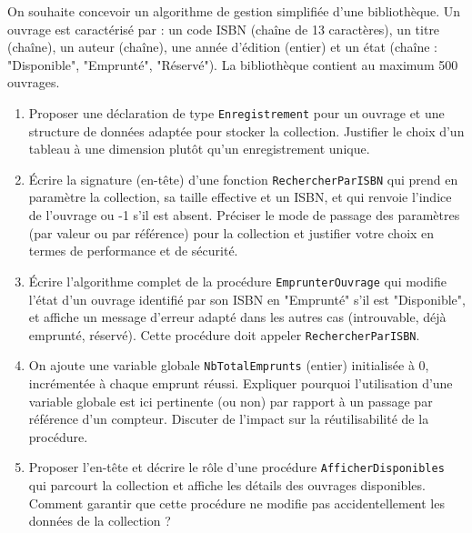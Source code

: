 \documentclass[11pt]{article}
\begin{document}
\begin{exercice}
On souhaite concevoir un algorithme de gestion simplifiée d'une bibliothèque. Un ouvrage est caractérisé par : un code ISBN (chaîne de 13 caractères), un titre (chaîne), un auteur (chaîne), une année d'édition (entier) et un état (chaîne : "Disponible", "Emprunté", "Réservé"). La bibliothèque contient au maximum 500 ouvrages.

\begin{enumerate}
    \item Proposer une déclaration de type \texttt{Enregistrement} pour un ouvrage et une structure de données adaptée pour stocker la collection. Justifier le choix d'un tableau à une dimension plutôt qu'un enregistrement unique.
    \item Écrire la signature (en-tête) d'une fonction \texttt{RechercherParISBN} qui prend en paramètre la collection, sa taille effective et un ISBN, et qui renvoie l'indice de l'ouvrage ou -1 s'il est absent. Préciser le mode de passage des paramètres (par valeur ou par référence) pour la collection et justifier votre choix en termes de performance et de sécurité.
    \item Écrire l'algorithme complet de la procédure \texttt{EmprunterOuvrage} qui modifie l'état d'un ouvrage identifié par son ISBN en "Emprunté" s'il est "Disponible", et affiche un message d'erreur adapté dans les autres cas (introuvable, déjà emprunté, réservé). Cette procédure doit appeler \texttt{RechercherParISBN}.
    \item On ajoute une variable globale \texttt{NbTotalEmprunts} (entier) initialisée à 0, incrémentée à chaque emprunt réussi. Expliquer pourquoi l'utilisation d'une variable globale est ici pertinente (ou non) par rapport à un passage par référence d'un compteur. Discuter de l'impact sur la réutilisabilité de la procédure.
    \item Proposer l'en-tête et décrire le rôle d'une procédure \texttt{AfficherDisponibles} qui parcourt la collection et affiche les détails des ouvrages disponibles. Comment garantir que cette procédure ne modifie pas accidentellement les données de la collection ?
\end{enumerate}
\end{exercice}
\end{document}
